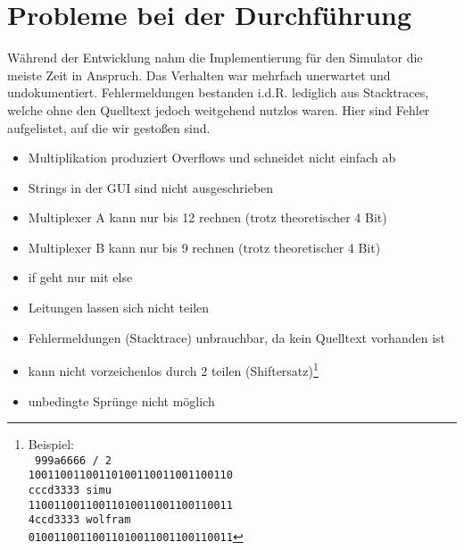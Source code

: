 \section{Probleme bei der Durchführung}
\label{section:Dokumentation-BenchmarkBewertung-Probleme}

Während der Entwicklung nahm die Implementierung für den Simulator die meiste Zeit in Anspruch. Das Verhalten war mehrfach unerwartet und undokumentiert. Fehlermeldungen bestanden i.d.R. lediglich aus Stacktraces, welche ohne den Quelltext jedoch weitgehend nutzlos waren. Hier sind Fehler aufgelistet, auf die wir gestoßen sind.

\begin{itemize}
    \item Multiplikation produziert Overflows und schneidet nicht einfach ab
    \item Strings in der GUI sind nicht ausgeschrieben
    \item Multiplexer A kann nur bis 12 rechnen (trotz theoretischer 4 Bit)
    \item Multiplexer B kann nur bis 9 rechnen (trotz theoretischer 4 Bit)
    \item if geht nur mit else
    \item Leitungen lassen sich nicht teilen
    \item Fehlermeldungen (Stacktrace) unbrauchbar, da kein Quelltext vorhanden ist
    \item kann nicht vorzeichenlos durch 2 teilen (Shiftersatz)\footnote{Beispiel:\\
\texttt{
999a6666 / 2\\
10011001100110100110011001100110\\
cccd3333 simu\\
11001100110011010011001100110011\\
4ccd3333 wolfram\\
01001100110011010011001100110011}}
    \item unbedingte Sprünge nicht möglich
\end{itemize}
